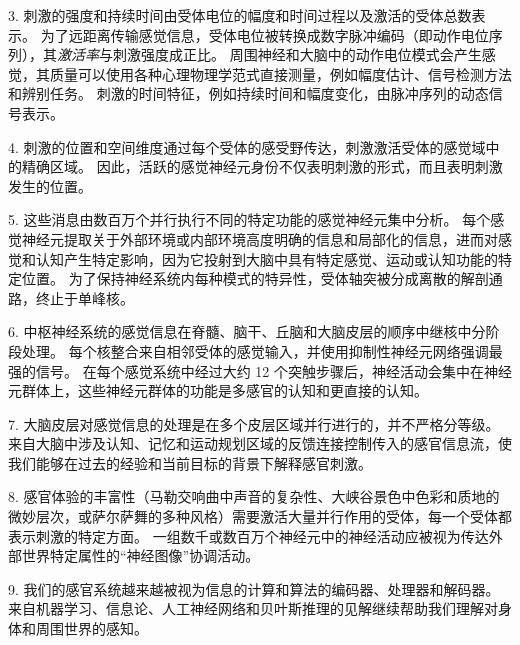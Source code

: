 3. 刺激的强度和持续时间由受体电位的幅度和时间过程以及激活的受体总数表示。
为了远距离传输感觉信息，受体电位被转换成数字脉冲编码（即动作电位序列），其\textit{激活率}与刺激强度成正比。
周围神经和大脑中的动作电位模式会产生感觉，其质量可以使用各种心理物理学范式直接测量，例如幅度估计、信号检测方法和辨别任务。
刺激的时间特征，例如持续时间和幅度变化，由脉冲序列的动态信号表示。

4. 刺激的位置和空间维度通过每个受体的感受野传达，刺激激活受体的感觉域中的精确区域。
因此，活跃的感觉神经元身份不仅表明刺激的形式，而且表明刺激发生的位置。

5. 这些消息由数百万个并行执行不同的特定功能的感觉神经元集中分析。
每个感觉神经元提取关于外部环境或内部环境高度明确的信息和局部化的信息，进而对感觉和认知产生特定影响，因为它投射到大脑中具有特定感觉、运动或认知功能的特定位置。
为了保持神经系统内每种模式的特异性，受体轴突被分成离散的解剖通路，终止于单峰核。


6. 中枢神经系统的感觉信息在脊髓、脑干、丘脑和大脑皮层的顺序中继核中分阶段处理。
每个核整合来自相邻受体的感觉输入，并使用抑制性神经元网络强调最强的信号。
在每个感觉系统中经过大约 12 个突触步骤后，神经活动会集中在神经元群体上，这些神经元群体的功能是多感官的认知和更直接的认知。


7. 大脑皮层对感觉信息的处理是在多个皮层区域并行进行的，并不严格分等级。 
来自大脑中涉及认知、记忆和运动规划区域的反馈连接控制传入的感官信息流，使我们能够在过去的经验和当前目标的背景下解释感官刺激。


8. 感官体验的丰富性（马勒交响曲中声音的复杂性、大峡谷景色中色彩和质地的微妙层次，或萨尔萨舞的多种风格）需要激活大量并行作用的受体，每一个受体都表示刺激的特定方面。
一组数千或数百万个神经元中的神经活动应被视为传达外部世界特定属性的“神经图像”协调活动。 


9. 我们的感官系统越来越被视为信息的计算和算法的编码器、处理器和解码器。
来自机器学习、信息论、人工神经网络和贝叶斯推理的见解继续帮助我们理解对身体和周围世界的感知。

